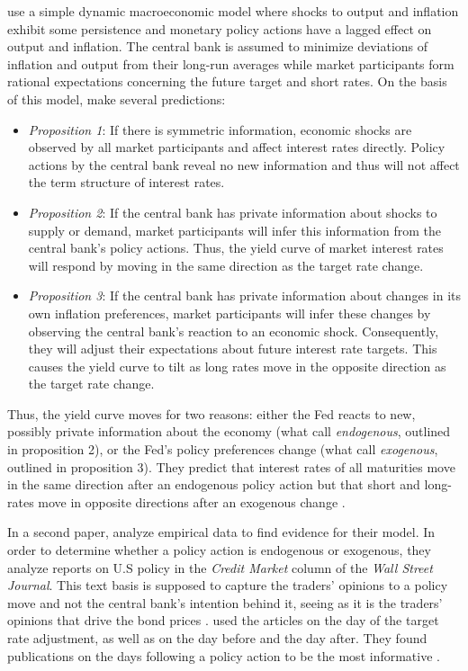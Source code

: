 \documentclass[11pt,a4paper,english,oneside]{book}
\numberwithin{equation}{chapter}
\begin{document}
\citet{Ellingsen.2001} use a simple dynamic macroeconomic model where shocks to output and inflation exhibit some persistence and monetary policy actions have a lagged effect on output and inflation. The central bank is assumed to minimize deviations of inflation and output from their long-run averages while market participants form rational expectations concerning the future target and short rates. On the basis of this model, \citet[~p. 1599--1602]{Ellingsen.2001} make several predictions:
\begin{itemize}
	\item \textit{Proposition 1}: If there is symmetric information, economic shocks are observed by all market participants and affect  interest rates directly. Policy actions by the central bank reveal no new information and thus will not affect the term structure of interest rates.
	\item \textit{Proposition 2}: If the central bank has private information about shocks to supply or demand, market participants will infer this information from the central bank's policy actions. Thus, the yield curve of market interest rates will respond by moving in the same direction as the target rate change. 
	\item \textit{Proposition 3}: If the central bank has private information about changes in its own inflation preferences, market participants will infer these changes by observing the central bank's reaction to an economic shock. Consequently, they will adjust their expectations about future interest rate targets. This causes the yield curve to tilt as long rates move in the opposite direction as the target rate change. 
\end{itemize}

Thus, the yield curve moves for two reasons: either the Fed reacts to new, possibly private information about the economy (what \citeauthor{Ellingsen.2001} call \textit{endogenous}, outlined in proposition 2), or the Fed's policy preferences change (what \citeauthor{Ellingsen.2001} call \textit{exogenous}, outlined in proposition 3). They predict that interest rates of all maturities move in the same direction after an endogenous policy action but that short and long-rates move in opposite directions after an exogenous change \citeyearpar[~p. 1594--1595]{Ellingsen.2001}. %

In a second paper, \cite{Ellingsen.2003} analyze empirical data to find evidence for their model. In order to determine whether a policy action is endogenous or exogenous, they analyze reports on U.S policy in the \textit{Credit Market} column of the \textit{Wall Street Journal}. This text basis is supposed to capture the traders' opinions to a policy move and not the central bank's intention behind it, seeing as it is the traders' opinions that drive the bond prices \cite[~p. 2]{Ellingsen.2003}. \citeauthor{Ellingsen.2003} used the articles on the day of the target rate adjustment, as well as on the day before and the day after. They found publications on the days following a policy action to be the most informative \citeyearpar[~p. 8]{Ellingsen.2003}.
\end{document}
